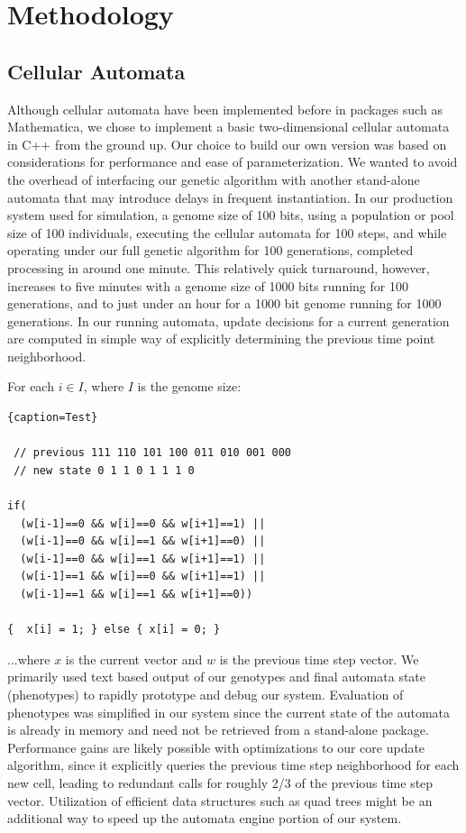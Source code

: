\documentclass[twocolumn]{article}
\begin{document}
\section{Methodology}

\subsection{Cellular Automata}
Although cellular automata have been implemented before in packages such as Mathematica, we chose to implement a basic two-dimensional cellular automata in C++ from the ground up.  Our choice to build our own version was based on considerations for performance and ease of parameterization.  We wanted to avoid the overhead of interfacing our genetic algorithm with another stand-alone automata that may introduce delays in frequent instantiation.  In our production system used for simulation, a genome size of 100 bits, using a population or pool size of 100 individuals, executing the cellular automata for 100 steps, and while operating under our full genetic algorithm for 100 generations, completed processing in around one minute.  This relatively quick turnaround, however, increases to five minutes with a genome size of 1000 bits running for 100 generations, and to just under an hour for a 1000 bit genome running for 1000 generations.  In our running automata, update decisions for a current generation are computed in simple way of explicitly determining the previous time point neighborhood.

For each $i \in I$, where $I$ is the genome size:

\lstset{language=C++,basicstyle=\footnotesize}
\begin{lstlisting}{caption=Test}

 // previous 111 110 101 100 011 010 001 000
 // new state 0 1 1 0 1 1 1 0

if(
  (w[i-1]==0 && w[i]==0 && w[i+1]==1) ||
  (w[i-1]==0 && w[i]==1 && w[i+1]==0) ||
  (w[i-1]==0 && w[i]==1 && w[i+1]==1) ||
  (w[i-1]==1 && w[i]==0 && w[i+1]==1) ||
  (w[i-1]==1 && w[i]==1 && w[i+1]==0))

{  x[i] = 1; } else { x[i] = 0; }

\end{lstlisting}

...where $x$ is the current vector and $w$ is the previous time step vector.  We primarily used text based output of our genotypes and final automata state (phenotypes) to rapidly prototype and debug our system.  Evaluation of phenotypes was simplified in our system since the current state of the automata is already in memory and need not be retrieved from a stand-alone package.  Performance gains are likely possible with optimizations to our core update algorithm, since it explicitly queries the previous time step neighborhood for each new cell, leading to redundant calls for roughly 2/3 of the previous time step vector.  Utilization of efficient data structures such as quad trees might be an additional way to speed up the automata engine portion of our system.
\end{document}
